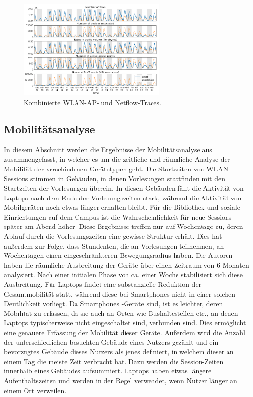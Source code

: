 \documentclass[12pt, a4paper]{article}
\begin{document}
\begin{figure}[H]
    \centering
    \includegraphics[width=0.65\textwidth]{img/traces.png}
    \caption{Kombinierte WLAN-AP- und Netflow-Traces. \cite{Alipour2018}}
    \label{fig:traces}
\end{figure}

\subsection{Mobilitätsanalyse}
\label{sec:phase2_a}

In diesem Abschnitt werden die Ergebnisse der Mobilitätsanalyse aus \cite{Alipour2018} zusammengefasst, in welcher es
um die zeitliche und räumliche Analyse der Mobilität der verschiedenen Gerätetypen geht.
Die Startzeiten von WLAN-Sessions stimmen in Gebäuden, in denen Vorlesungen stattfinden mit den Startzeiten der Vorlesungen überein.
In diesen Gebäuden fällt die Aktivität von Laptops nach dem Ende der Vorlesungszeiten stark, während die Aktivität von Mobilgeräten
noch etwas länger erhalten bleibt. Für die Bibliothek und soziale Einrichtungen auf dem Campus ist die Wahrscheinlichkeit
für neue Sessions später am Abend höher. Diese Ergebnisse treffen nur auf Wochentage zu, deren Ablauf durch
die Vorlesungszeiten eine gewisse Struktur erhält.
Dies hat außerdem zur Folge, dass Stundenten, die an Vorlesungen teilnehmen, an Wochentagen einen eingeschränkteren Bewegungsradius haben.
Die Autoren haben die räumliche Ausbreitung der Geräte über einen Zeitraum von $6$ Monaten analysiert.
Nach einer initialen Phase von ca. einer Woche stabilisiert sich diese Ausbreitung. Für Laptops findet eine 
substanzielle Reduktion der Gesamtmobilität statt, während diese bei Smartphones nicht in einer solchen Deutlichkeit vorliegt.
Da Smartphones -Geräte sind, ist es leichter, deren Mobilität zu erfassen, da sie auch an Orten
wie Bushaltestellen etc., an denen Laptops typischerweise nicht eingeschaltet sind, verbunden sind.
Dies ermöglicht eine genauere Erfassung der Mobilität dieser Geräte.
Außerdem wird die Anzahl der unterschiedlichen besuchten Gebäude eines Nutzers gezählt und ein bevorzugtes
Gebäude dieses Nutzers als jenes definiert, in welchem dieser an einem Tag die meiste Zeit verbracht hat.
Dazu werden die Session-Zeiten innerhalb eines Gebäudes aufsummiert.
Laptops haben etwas längere Aufenthaltszeiten und werden in der Regel verwendet, wenn Nutzer länger an einem Ort verweilen.
\end{document}
